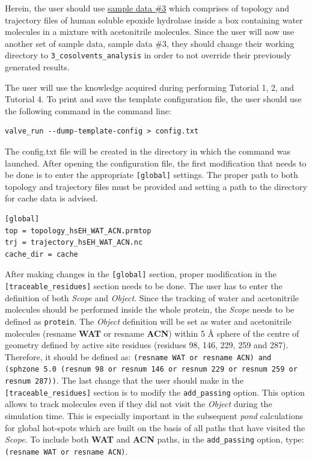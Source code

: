 \documentclass[9pt,tutorial]{livecoms}
\begin{document}
Herein, the user should use \href{http://www.aquaduct.pl/user-guide/}{sample data \#3} which comprises of topology and trajectory files of human soluble epoxide hydrolase inside a box containing water molecules in a mixture with acetonitrile molecules. Since the user will now use another set of sample data, sample data \#3, they should change their working directory to \texttt{3\_cosolvents\_analysis} in order to not override their previously generated results.

The user will use the knowledge acquired during performing Tutorial 1, 2, and Tutorial 4. To print and save the template configuration file, the user should use the following command in the command line:
\begin{lstlisting}[columns=fullflexible]
valve_run --dump-template-config > config.txt
\end{lstlisting}
The config.txt file will be created in the directory in which the command was launched. After opening the configuration file, the first modification that needs to be done is to enter the appropriate \texttt{[global]} settings. The proper path to both topology and trajectory files must be provided and setting a path to the directory for cache data is advised. 
\begin{lstlisting}
[global]
top = topology_hsEH_WAT_ACN.prmtop
trj = trajectory_hsEH_WAT_ACN.nc
cache_dir = cache
\end{lstlisting}
After making changes in the \texttt{[global]} section, proper modification in the \texttt{[traceable\_residues]} section needs to be done. The user has to enter the definition of both \emph{Scope} and \emph{Object}. Since the tracking of water and acetonitrile molecules should be performed inside the whole protein, the \textit{Scope} needs to be defined as \texttt{protein}. The \emph{Object} definition will be set as water and acetonitrile molecules (resname \textbf{WAT} or resname \textbf{ACN}) within 5 Å sphere of the centre of geometry defined by active site residues (residues 98, 146, 229, 259 and 287). Therefore, it should be defined as: \texttt{(resname WAT or resname ACN) and (sphzone 5.0 (resnum 98 or resnum 146 or resnum 229 or resnum 259 or resnum 287))}. The last change that the user should make in the \texttt{[traceable\_residues]} section is to modify the \texttt{add\_passing} option. This option allows to track molecules even if they did not visit the \emph{Object} during the simulation time. This is especially important in the subsequent \emph{pond} calculations for global hot-spots which are built on the basis of all paths that have visited the \emph{Scope}. To include both \textbf{WAT} and \textbf{ACN} paths, in the \texttt{add\_passing} option, type: \texttt{(resname WAT or resname ACN)}.
\end{document}
